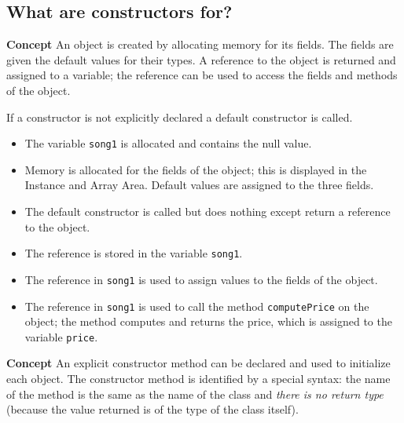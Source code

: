 \subsection{What are constructors for?}\label{con.01}

\textbf{Concept} An object is created by allocating memory for its fields. The fields are given the default values for their types. A reference to the object is returned and assigned to a variable; the reference can be used to access the fields and methods of the object.


If a constructor is not explicitly declared a default constructor is called.
\begin{itemize}
\item The variable \texttt{song1} is allocated and contains the null value.
\item Memory is allocated for the fields of the object; this is displayed in the Instance and Array Area. Default values are assigned to the three fields.
\item The default constructor is called 
but does nothing except return a reference to the object.
\item The reference is stored in the variable \texttt{song1}.
\item The reference in \texttt{song1} is used to assign values to the fields of the object.
\item The reference in \texttt{song1} is used to call the method \texttt{computePrice} on the object; the method computes and returns the price, 
which is assigned to the variable \texttt{price}.
\end{itemize}

\bigskip

\textbf{Concept} An explicit constructor method can be declared and used 
to initialize each object. 
The constructor method is identified by a special syntax: the name of the method is the same as the name of the class and \emph{there is no return type} (because the value returned is of the type of the class itself).


